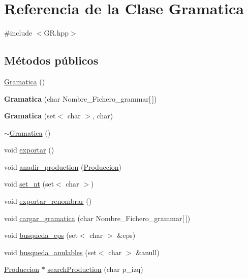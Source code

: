 \hypertarget{class_gramatica}{}\section{Referencia de la Clase Gramatica}
\label{class_gramatica}


{\ttfamily \#include $<$G\+R.\+hpp$>$}

\subsection*{Métodos públicos}
\begin{DoxyCompactItemize}
\item 
\hyperlink{class_gramatica_a22ad135e5e5fc60820c26b0c4085cef7}{Gramatica} ()
\item 
\mbox{\label{class_gramatica_a946e58e8bc3705292490e6e057b56a9d}} 
{\bfseries Gramatica} (char Nombre\+\_\+\+Fichero\+\_\+grammar\mbox{[}$\,$\mbox{]})
\item 
\mbox{\label{class_gramatica_ae9176ae1de55840b18642b1428bea25a}} 
{\bfseries Gramatica} (set$<$ char $>$, char)
\item 
\hyperlink{class_gramatica_a25b75ecf041599ef652ff37156db1e17}{$\sim$\+Gramatica} ()
\item 
void \hyperlink{class_gramatica_ae18ba291a24ebcb6faff237c4eb33c29}{exportar} ()
\item 
void \hyperlink{class_gramatica_ada4af4c0eba8a829a98417168e93d2db}{anadir\+\_\+production} (\hyperlink{class_produccion}{Produccion})
\item 
void \hyperlink{class_gramatica_ae11df05a075362d577443b8f011aa24f}{set\+\_\+nt} (set$<$ char $>$)
\item 
void \hyperlink{class_gramatica_ab1d5812fb240512ef0255b0382dd844d}{exportar\+\_\+renombrar} ()
\item 
void \hyperlink{class_gramatica_ac63eb5aa47382764880dc1c72680ce48}{cargar\+\_\+gramatica} (char Nombre\+\_\+\+Fichero\+\_\+grammar\mbox{[}$\,$\mbox{]})
\item 
void \hyperlink{class_gramatica_a5bed20d9bb4c86052b3765b025128884}{busqueda\+\_\+eps} (set$<$ char $>$ \&eps)
\item 
void \hyperlink{class_gramatica_a6d752e6f50981a562330cba09d14582b}{busqueda\+\_\+anulables} (set$<$ char $>$ \&anull)
\item 
\hyperlink{class_produccion}{Produccion} $\ast$ \hyperlink{class_gramatica_a1b06d74eaad028671146e0c2c28badcb}{search\+Production} (char p\+\_\+izq)

\end{DoxyCompactItemize}
